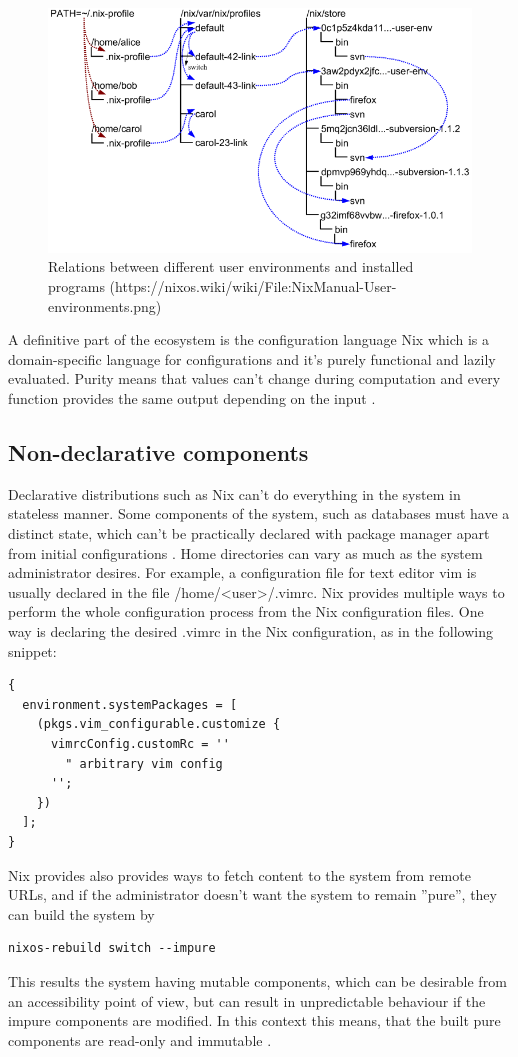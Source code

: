 \begin{figure} \label{userenv}
    \centering
    \includegraphics{latex/kuvat/user-environments.png}
    \caption{Relations between different user environments and installed programs (https://nixos.wiki/wiki/File:NixManual-User-environments.png)}
    \label{userenvs}
\end{figure}

A definitive part of the ecosystem is the configuration language Nix which is a domain-specific language for configurations and it's purely functional and lazily evaluated. Purity means that values can't change during computation and every function provides the same output depending on the input \cite{dolstra2013charon}.

\subsection{Non-declarative components} \label{nondeclarative}

Declarative distributions such as Nix can't do everything in the system in stateless manner. Some components of the system, such as databases must have a distinct state, which can't be practically declared with package manager apart from initial configurations \cite{van2013reference}. Home directories can vary as much as the system administrator desires. For example, a configuration file for text editor vim is usually declared in the file /home/<user>/.vimrc. Nix provides multiple ways to perform the whole configuration process from the Nix configuration files. One way is declaring the desired .vimrc in the Nix configuration, as in the following snippet: \begin{lstlisting}
{
  environment.systemPackages = [
    (pkgs.vim_configurable.customize {
      vimrcConfig.customRc = ''
        " arbitrary vim config
      '';
    })
  ];
}
\end{lstlisting}
Nix provides also provides ways to fetch content to the system from remote URLs, and if the administrator doesn't want the system to remain ''pure'', they can build the system by \begin{lstlisting}
nixos-rebuild switch --impure
\end{lstlisting}
This results the system having mutable components, which can be desirable from an accessibility point of view, but can result in unpredictable behaviour if the impure components are modified. In this context this means, that the built pure components are read-only and immutable \cite{dolstra2010nixos}.

